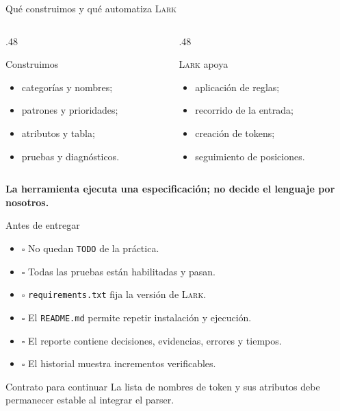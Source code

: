 \documentclass[11pt,spanish]{beamer}
\newcommand{\term}[1]{\textbf{\textcolor{indiagreen!80!black}{#1}}}
\begin{document}
\begin{frame}{Qué construimos y qué automatiza \textsc{Lark}}
\vfill

\begin{columns}[T,onlytextwidth]
\begin{column}{.48\textwidth}
\begin{block}{Construimos}
\begin{itemize}
  \item categorías y nombres;
  \item patrones y prioridades;
  \item atributos y tabla;
  \item pruebas y diagnósticos.
\end{itemize}
\end{block}
\end{column}
\begin{column}{.48\textwidth}
\begin{block}{\textsc{Lark} apoya}
\begin{itemize}
  \item aplicación de reglas;
  \item recorrido de la entrada;
  \item creación de tokens;
  \item seguimiento de posiciones.
\end{itemize}
\end{block}
\end{column}
\end{columns}

\bigskip

\term{La herramienta ejecuta una especificación; no decide el lenguaje por nosotros.}

\vfill
\end{frame}

\begin{frame}{Antes de entregar}
\vfill

\begin{itemize}
  \item \(\square\) No quedan \texttt{TODO} de la práctica.
  \item \(\square\) Todas las pruebas están habilitadas y pasan.
  \item \(\square\) \texttt{requirements.txt} fija la versión de \textsc{Lark}.
  \item \(\square\) El \texttt{README.md} permite repetir instalación y ejecución.
  \item \(\square\) El reporte contiene decisiones, evidencias, errores y tiempos.
  \item \(\square\) El historial muestra incrementos verificables.
\end{itemize}

\begin{block}{Contrato para continuar}
La lista de nombres de token y sus atributos debe permanecer estable al integrar el parser.
\end{block}

\vfill
\end{frame}
\end{document}
